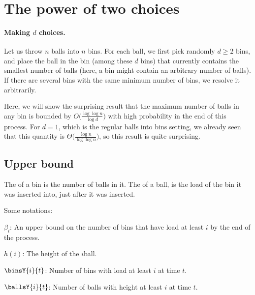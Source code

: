 \section{The power of two choices}
%

\paragraph*{Making $d$ choices.}
Let us throw $n$ balls into $n$ bins. For each ball, we first pick
randomly $d\geq 2$ bins, and place the ball in the bin (among these
$d$ bins) that currently contains the smallest number of balls (here,
a bin might contain an arbitrary number of balls). If there are
several bins with the same minimum number of bins, we resolve it
arbitrarily.

Here, we will show the surprising result that the maximum number of
balls in any bin is bounded by
$O\bigl( \tfrac{\log \log n}{\log d} \bigr)$ with high probability in
the end of this process. For $d=1$, which is the regular balls into
bins setting, we already seen that this quantity is
$\Theta\bigl( \tfrac{\log n}{ \log \log n}\bigr)$, so this result is
quite surprising.



\subsection{Upper bound}

\begin{defn}
    The  of a bin is the number of balls in it. The
     of a ball, is the load of the bin it was inserted
    into, just after it was inserted.
\end{defn}


Some notations:
\begin{compactenumA}
    \item $\beta_i$: An upper bound on the number of bins that have
    load at least $i$ by the end of the process.
    
    \item $h(i)$: The height of the $i$\th ball.

    \item $\binsY{i}{t}$: Number of bins with load at least $i$ at
    time $t$.

    \item $\ballsY{i}{t}$: Number of balls with height at least $i$ at
    time $t$.
\end{compactenumA}

